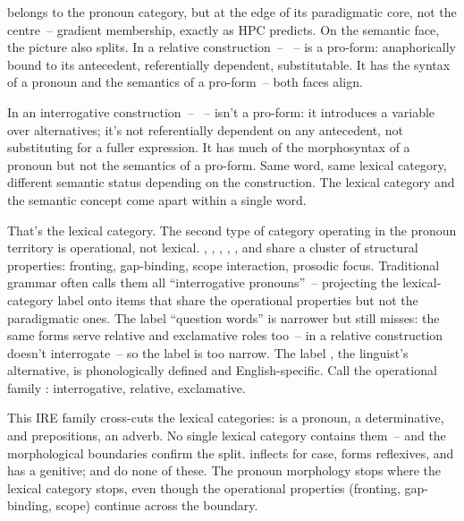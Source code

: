  belongs to the pronoun category, but at the edge of its paradigmatic core, not the centre~-- gradient membership, exactly as HPC predicts. On the semantic face, the picture also splits. In a relative construction~-- ~--  is a pro-form: anaphorically bound to its antecedent, referentially dependent, substitutable. It has the syntax of a pronoun and the semantics of a pro-form~-- both faces align.

In an interrogative construction~-- ~--  isn't a pro-form: it introduces a variable over alternatives; it's not referentially dependent on any antecedent, not substituting for a fuller expression. It has much of the morphosyntax of a pronoun but not the semantics of a pro-form. Same word, same lexical category, different semantic status depending on the construction. The lexical category and the semantic concept come apart within a single word.

That's the lexical category. The second type of category operating in the pronoun territory is operational, not lexical. , , , , , and  share a cluster of structural properties: fronting, gap-binding, scope interaction, prosodic focus. Traditional grammar often calls them all \enquote{interrogative pronouns}~-- projecting the lexical-category label onto items that share the operational properties but not the paradigmatic ones. The label \enquote{question words} is narrower but still misses: the same forms serve relative and exclamative roles too~--  in a relative construction doesn't interrogate~-- so the label is too narrow. The label , the linguist's alternative, is phonologically defined and English-specific. Call the operational family : interrogative, relative, exclamative.

This IRE family cross-cuts the lexical categories:  is a pronoun,  a determinative,  and  prepositions,  an adverb. No single lexical category contains them~-- and the morphological boundaries confirm the split.  inflects for case, forms reflexives, and has a genitive;  and  do none of these. The pronoun morphology stops where the lexical category stops, even though the operational properties (fronting, gap-binding, scope) continue across the boundary.

